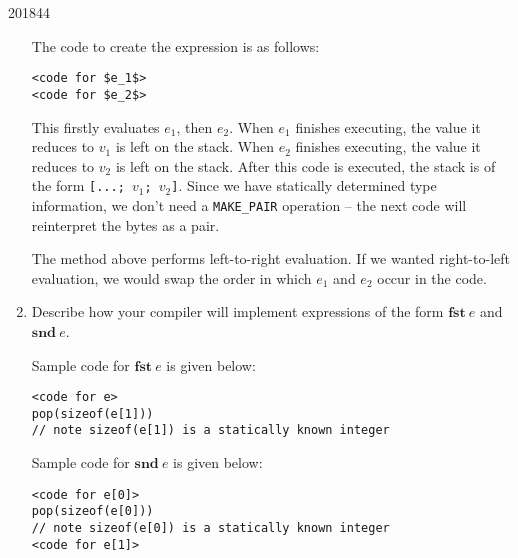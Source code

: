 \documentclass[10pt,\jkfside,a4paper]{article}
\begin{document}
\begin{examquestion}{2018}{4}{4}
\begin{enumerate}
The code to create the expression is as follows:
\begin{lstlisting}[mathescape=true]
<code for $e_1$>
<code for $e_2$>
\end{lstlisting}

This firstly evaluates $e_1$, then $e_2$. When $e_1$ finishes executing, the
value it reduces to $v_1$ is left on the stack. When $e_2$ finishes executing,
the value it reduces to $v_2$ is left on the stack. After this code is
executed, the stack is of the form \texttt{[...; $v_1$; $v_2$]}. Since we
have statically determined type information, we don't need a
\texttt{MAKE\_PAIR} operation -- the next code will reinterpret the bytes as
a pair.

The method above performs left-to-right evaluation. If we wanted
right-to-left evaluation, we would swap the order in which $e_1$ and $e_2$
occur in the code.

\item Describe how your compiler will implement expressions of the form
$\mathbf{fst}\ e$ and $\mathbf{snd}\ e$.

Sample code for $\mathbf{fst}\ e$ is given below:
\begin{lstlisting}
<code for e>
pop(sizeof(e[1]))
// note sizeof(e[1]) is a statically known integer
\end{lstlisting}

Sample code for $\mathbf{snd}\ e$ is given below:
\begin{lstlisting}
<code for e[0]>
pop(sizeof(e[0]))
// note sizeof(e[0]) is a statically known integer
<code for e[1]>
\end{lstlisting}

\end{enumerate}

\end{examquestion}
\end{document}

